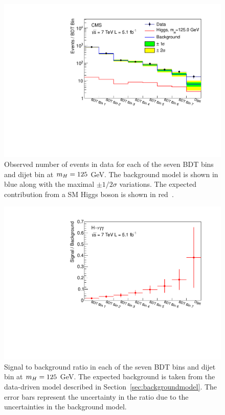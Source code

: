 \begin{figure}
\begin{center}
  \includegraphics[width=.8\textwidth]{hgg7TeV/sidebandMvaPlots/hgg_MassWindow_model_m125.pdf}
\end{center}
 \caption{Observed number of events in data for each of the seven BDT bins and dijet bin 
 at $m_{H}=125$ GeV. The background model is shown in blue along with the maximal $\pm 1/2\sigma$ variations.
 The expected contribution from a SM Higgs boson is shown in red~\citep{HIG-12-036}.}
 \label{fig:results7TeV}
\end{figure}
\begin{figure}
\begin{center}
  \includegraphics[width=.8\textwidth]{hgg7TeV/sidebandMvaPlots/soverb_m125.pdf}
\end{center}
 \caption{Signal to background ratio in each of the seven BDT bins and dijet bin at $m_{H}=125$ GeV.
The expected background is taken from the data-driven model described in Section~\ref{sec:backgroundmodel}. 
The error bars represent the uncertainty in the ratio due to the uncertainties in the background model.}
 \label{fig:results7TeV_soverb}
\end{figure}

